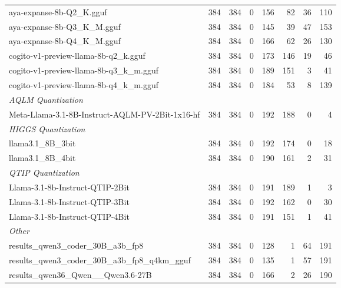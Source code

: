 \begin{table}[htbp]
{\begin{tabular}{lrrrrrrr}
    aya-expanse-8b-Q2\_K.gguf & 384 & 384 & 0 & 156 & 82 & 36 & 110 \\
    aya-expanse-8b-Q3\_K\_M.gguf & 384 & 384 & 0 & 145 & 39 & 47 & 153 \\
    aya-expanse-8b-Q4\_K\_M.gguf & 384 & 384 & 0 & 166 & 62 & 26 & 130 \\
    cogito-v1-preview-llama-8b-q2\_k.gguf & 384 & 384 & 0 & 173 & 146 & 19 & 46 \\
    cogito-v1-preview-llama-8b-q3\_k\_m.gguf & 384 & 384 & 0 & 189 & 151 & 3 & 41 \\
    cogito-v1-preview-llama-8b-q4\_k\_m.gguf & 384 & 384 & 0 & 184 & 53 & 8 & 139 \\
    \midrule
    \multicolumn{8}{l}{\textit{AQLM Quantization}} \\
    \midrule
    Meta-Llama-3.1-8B-Instruct-AQLM-PV-2Bit-1x16-hf & 384 & 384 & 0 & 192 & 188 & 0 & 4 \\
    \midrule
    \multicolumn{8}{l}{\textit{HIGGS Quantization}} \\
    \midrule
    llama3.1\_8B\_3bit & 384 & 384 & 0 & 192 & 174 & 0 & 18 \\
    llama3.1\_8B\_4bit & 384 & 384 & 0 & 190 & 161 & 2 & 31 \\
    \midrule
    \multicolumn{8}{l}{\textit{QTIP Quantization}} \\
    \midrule
    Llama-3.1-8b-Instruct-QTIP-2Bit & 384 & 384 & 0 & 191 & 189 & 1 & 3 \\
    Llama-3.1-8b-Instruct-QTIP-3Bit & 384 & 384 & 0 & 192 & 162 & 0 & 30 \\
    Llama-3.1-8b-Instruct-QTIP-4Bit & 384 & 384 & 0 & 191 & 151 & 1 & 41 \\
    \midrule
    \multicolumn{8}{l}{\textit{Other}} \\
    \midrule
    results\_qwen3\_coder\_30B\_a3b\_fp8 & 384 & 384 & 0 & 128 & 1 & 64 & 191 \\
    results\_qwen3\_coder\_30B\_a3b\_fp8\_q4km\_gguf & 384 & 384 & 0 & 135 & 1 & 57 & 191 \\
    results\_qwen36\_Qwen\_\_Qwen3.6-27B & 384 & 384 & 0 & 166 & 2 & 26 & 190 \\
    \bottomrule
  \end{tabular}
  }
\end{table}

